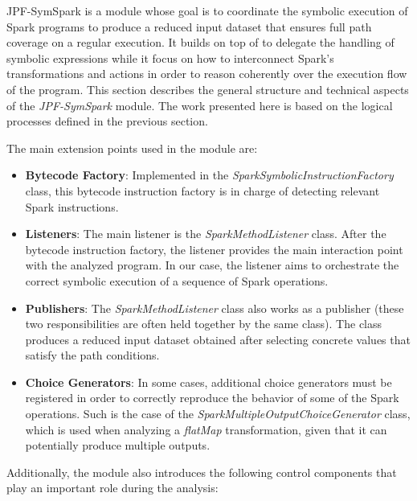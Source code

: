 \label{sec:jpf-symspark}

JPF-SymSpark is a \jpf module whose goal is to coordinate the symbolic execution of Spark programs to produce a reduced input dataset that ensures full path coverage on a regular execution. It builds on top of \spf to delegate the handling of symbolic expressions while it focus on how to interconnect Spark's transformations and actions in order to reason coherently over the execution flow of the program. This section describes the general structure and technical aspects of the \textit{JPF-SymSpark} module. The work presented here is based on the logical processes defined in the previous section. 

The main \jpf extension points used in the module are:

\begin{itemize}
	\item \textbf{Bytecode Factory}: Implemented in the \textit{SparkSymbolicInstructionFactory} class, this bytecode instruction factory is in charge of detecting relevant Spark instructions.
	\item \textbf{Listeners}: The main listener is the \textit{SparkMethodListener} class. After the bytecode instruction factory, the listener provides the main interaction point with the analyzed program. In our case, the listener aims to orchestrate the correct symbolic execution of a sequence of Spark operations.
	\item \textbf{Publishers}: The \textit{SparkMethodListener} class also works as a publisher (these two responsibilities are often held together by the same class). The class produces a reduced input dataset obtained after selecting concrete values that satisfy the path conditions.
	\item \textbf{Choice Generators}: In some cases, additional choice generators must be registered in order to correctly reproduce the behavior of some of the Spark operations. Such is the case of the \textit{SparkMultipleOutputChoiceGenerator} class, which is used when analyzing a \textit{flatMap} transformation, given that it can potentially produce multiple outputs.
\end{itemize}

Additionally, the module also introduces the following control components that play an important role during the analysis:

